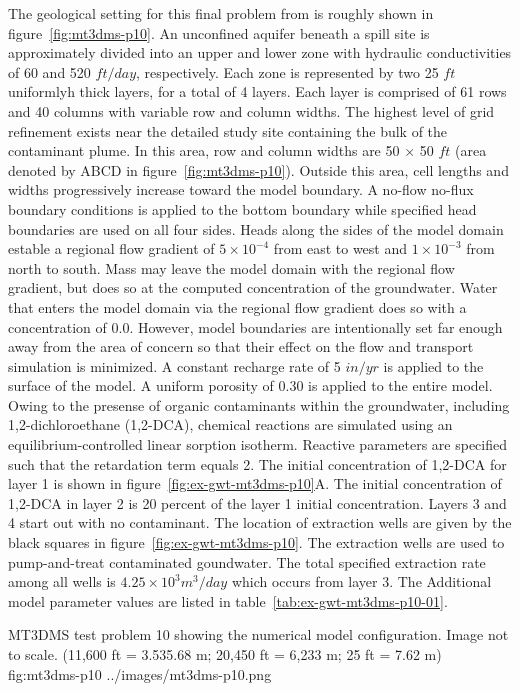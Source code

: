 The geological setting for this final problem from \cite{zheng1999mt3dms} is roughly shown in figure~\ref{fig:mt3dms-p10}.  An unconfined aquifer beneath a spill site is approximately divided into an upper and lower zone with hydraulic conductivities of 60 and 520 $ft/day$, respectively.  Each zone is represented by two 25 $ft$ uniformlyh thick layers, for a total of 4 layers.  Each layer is comprised of 61 rows and 40 columns with variable row and column widths.  The highest level of grid refinement exists near the detailed study site containing the bulk of the contaminant plume.  In this area, row and column widths are 50 $\times$ 50 $ft$ (area denoted by ABCD in figure~\ref{fig:mt3dms-p10}). Outside this area, cell lengths and widths progressively increase toward the model boundary.  A no-flow no-flux boundary conditions is applied to the bottom boundary while specified head boundaries are used on all four sides.  Heads along the sides of the model domain estable a regional flow gradient of $5 \times 10^{-4}$ from east to west and $1 \times 10^{-3}$ from north to south.  Mass may leave the model domain with the regional flow gradient, but does so at the computed concentration of the groundwater. Water that enters the model domain via the regional flow gradient does so with a concentration of 0.0.  However, model boundaries are intentionally set far enough away from the area of concern so that their effect on the flow and transport simulation is minimized.  A constant recharge rate of 5 $in/yr$ is applied to the surface of the model.  A uniform porosity of 0.30 is applied to the entire model.  Owing to the presense of organic contaminants within the groundwater, including 1,2-dichloroethane (1,2-DCA), chemical reactions are simulated using an equilibrium-controlled linear sorption isotherm.  Reactive parameters are specified such that the retardation term equals 2.  The initial concentration of 1,2-DCA for layer 1 is shown in figure~\ref{fig:ex-gwt-mt3dms-p10}A. The initial concentration of 1,2-DCA in layer 2 is 20 percent of the layer 1 initial concentration.  Layers 3 and 4 start out with no contaminant.  The location of extraction wells are given by the black squares in figure~\ref{fig:ex-gwt-mt3dms-p10}. The extraction wells are used to pump-and-treat contaminated goundwater.  The total specified extraction rate among all wells is $4.25 \times 10^3 m^3/day$ which occurs from layer 3. The Additional model parameter values are listed in table~\ref{tab:ex-gwt-mt3dms-p10-01}.  

\begin{StandardFigure}
	{MT3DMS test problem 10 showing the numerical model configuration.  Image not to scale. (11,600 ft = 3.535.68 m; 20,450 ft = 6,233 m; 25 ft = 7.62 m)} 
	{fig:mt3dms-p10}
	{../images/mt3dms-p10.png}
\end{StandardFigure}

